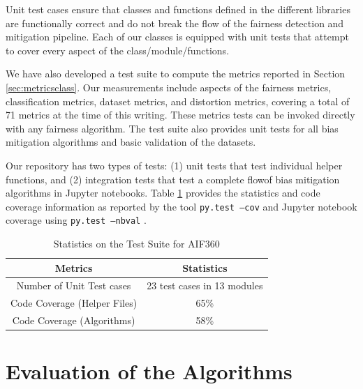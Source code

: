 \documentclass{article}
\newcommand{\squeezeup}{\vspace{-2mm}}
\begin{document}
Unit test cases ensure that classes and functions defined in the different libraries are functionally correct and do not break the flow of the fairness detection and mitigation pipeline.  Each of our classes is equipped with unit tests that attempt to cover every aspect of the class/module/functions.  

We have also developed a test suite to compute the metrics reported in Section \ref{sec:metricsclass}. Our measurements include aspects of the fairness metrics, classification metrics, dataset metrics, and distortion metrics, covering a total of 71 metrics at the time of this writing. These metrics tests can be invoked directly with any fairness algorithm.
The test suite also provides unit tests for all bias mitigation algorithms 
and basic validation of  the datasets.   
 
 Our repository has two types of tests: (1) unit tests that test individual helper functions, 
and (2) integration tests that test a complete flowof bias mitigation algorithms in Jupyter notebooks. Table \ref{tab:devopstats} provides the statistics and code coverage information as reported by the tool \texttt{py.test --cov} and Jupyter notebook coverage using \texttt{py.test --nbval} .  

 
 \begin{table}[h!]
 \begin{scriptsize}
 \caption{Statistics on the Test Suite for AIF360}
     \label{tab:devopstats}
     \begin{center}
     \begin{tabular}{|c|c|}
     \hline
      Metrics & Statistics \\
      \hline
         Number of Unit Test cases & 23 test cases in 13 modules \\
          Code Coverage (Helper Files) & 65\%\\
          Code Coverage (Algorithms) & 58\%\\
    \hline
     \end{tabular}
     \end{center}
 \end{scriptsize}
 \end{table}
 \squeezeup
 



\section{Evaluation of the Algorithms}
\end{document}
